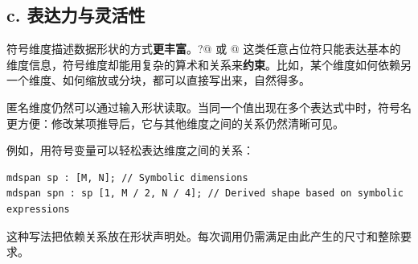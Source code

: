 \subsection*{\textbf{c. 表达力与灵活性}}

符号维度描述数据形状的方式\textbf{更丰富}。\co@?@ 或 @ 这类任意占位符只能表达基本的维度信息，符号维度却能用复杂的算术和关系来\textbf{约束}。比如，某个维度如何依赖另一个维度、如何缩放或分块，都可以直接写出来，自然得多。

匿名维度仍然可以通过输入形状读取。当同一个值出现在多个表达式中时，符号名更方便：修改某项推导后，它与其他维度之间的关系仍然清晰可见。

例如，用符号变量可以轻松表达维度之间的关系：

\begin{lstlisting}[language=croqtile,caption={c. 表达力与灵活性}]
mdspan sp : [M, N]; // Symbolic dimensions
mdspan spn : sp [1, M / 2, N / 4]; // Derived shape based on symbolic expressions
\end{lstlisting}

这种写法把依赖关系放在形状声明处。每次调用仍需满足由此产生的尺寸和整除要求。

